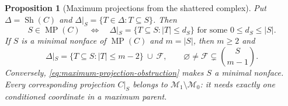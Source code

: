 \documentclass[11pt]{article}
\newtheorem{proposition}{Proposition}[section]
\theoremstyle{definition}
\newcommand{\Sh}{\operatorname{Sh}}
\begin{document}
\begin{proposition}[Maximum projections from the shattered complex]
\label{prop:maximum-projection-complex}
Put $\Delta=\Sh(C)$ and $\Delta|_S=\{T\in\Delta:T\subseteq S\}$.
Then
\begin{equation}\label{eq:maximum-projection-skeleton}
 S\in\operatorname{MP}(C)
 \quad\Longleftrightarrow\quad
 \Delta|_S=\{T\subseteq S:|T|\le d_S\}
 \text{ for some }0\le d_S\le |S|.
\end{equation}
If $S$ is a minimal nonface of $\operatorname{MP}(C)$ and $m=|S|$,
then $m\ge2$ and
\begin{equation}\label{eq:maximum-projection-obstruction}
 \Delta|_S=\{T\subseteq S:|T|\le m-2\}\ \cup\ \mathcal F,
 \qquad
 \varnothing\ne\mathcal F\subsetneq\binom{S}{m-1}.
\end{equation}
Conversely, \eqref{eq:maximum-projection-obstruction} makes $S$ a minimal
nonface. Every corresponding projection $C|_S$ belongs to
$\mathcal M_1\setminus\mathcal M_0$: it needs exactly one conditioned
coordinate in a maximum parent.
\end{proposition}
\end{document}
